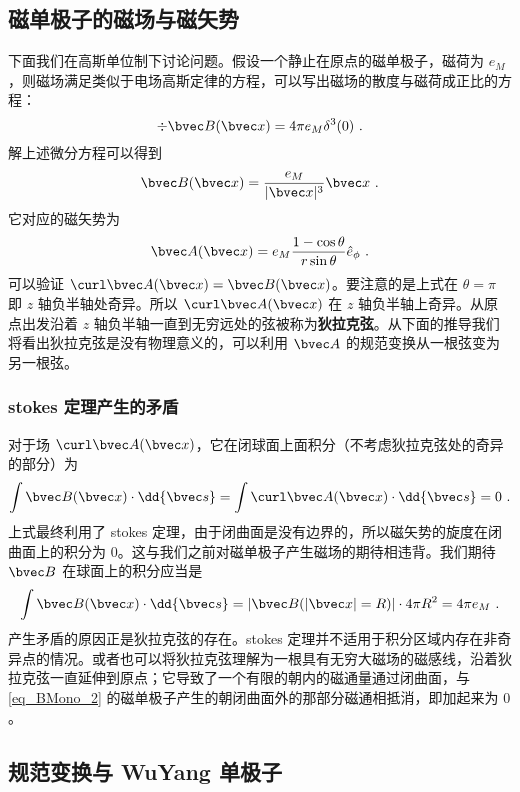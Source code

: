 \subsection{磁单极子的磁场与磁矢势}
下面我们在高斯单位制下讨论问题。假设一个静止在原点的磁单极子，磁荷为 $e_M$，则磁场满足类似于电场高斯定律的方程，可以写出磁场的散度与磁荷成正比的方程：
\begin{equation}\label{eq_BMono_4}
\div \bvec B(\bvec x)= 4\pi e_M\delta^3(0)~.
\end{equation}
解上述微分方程可以得到
\begin{equation}
\bvec B(\bvec x)=\frac{e_M}{|\bvec x|^3}\bvec x~.
\end{equation}
它对应的磁矢势为
\begin{equation}\label{eq_BMono_5}
\bvec A(\bvec x)=e_M \frac{1-\cos\theta}{r\sin\theta} \hat e_\phi~.
\end{equation}
可以验证 $\curl \bvec A(\bvec x) = \bvec B(\bvec x)$。要注意的是上式在 $\theta=\pi$ 即 $z$ 轴负半轴处奇异。所以 $\curl \bvec A(\bvec x)$ 在 $z$ 轴负半轴上奇异。从原点出发沿着 $z$ 轴负半轴一直到无穷远处的弦被称为\textbf{狄拉克弦}。从下面的推导我们将看出狄拉克弦是没有物理意义的，可以利用 $\bvec A$ 的规范变换从一根弦变为另一根弦。
\subsubsection{stokes 定理产生的矛盾}
对于场 $\curl \bvec A(\bvec x)$，它在闭球面上面积分（不考虑狄拉克弦处的奇异的部分）为
\begin{equation}\label{eq_BMono_3}
\int \bvec B(\bvec x)\cdot \dd{\bvec s} =\int \curl \bvec A(\bvec x) \cdot \dd{\bvec s}=0~. 
\end{equation}
上式最终利用了 stokes 定理，由于闭曲面是没有边界的，所以磁矢势的旋度在闭曲面上的积分为 $0$。这与我们之前对磁单极子产生磁场的期待相违背。我们期待 $\bvec B$ 在球面上的积分应当是
\begin{equation}\label{eq_BMono_2}
\int \bvec B(\bvec x)\cdot \dd{\bvec s}=|\bvec B(|\bvec x|=R)|\cdot 4\pi R^2=4\pi e_M~.
\end{equation}
产生矛盾的原因正是狄拉克弦的存在。stokes 定理并不适用于积分区域内存在非奇异点的情况。或者也可以将狄拉克弦理解为一根具有无穷大磁场的磁感线，沿着狄拉克弦一直延伸到原点；它导致了一个有限的朝内的磁通量通过闭曲面，与\autoref{eq_BMono_2} 的磁单极子产生的朝闭曲面外的那部分磁通相抵消，即加起来为 $0$。
\subsection{规范变换与 WuYang 单极子}

